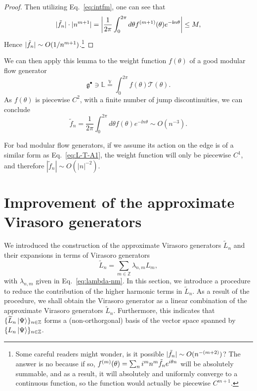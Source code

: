 \documentclass[12pt, nofootinbib]{article}
\theoremstyle{plain}
\theoremstyle{assumption}
\theoremstyle{definition}
\theoremstyle{plain}
\theoremstyle{plain}
\theoremstyle{plain}
\theoremstyle{plain}
\theoremstyle{plain}
\def\veq{\stackrel{\mathbb{V}}{=}}
\def\Lb{\mathbb{L}}
\def\Leff{\widetilde{L}}
\def\Tcft{\mathscr{T}}
\def\gc{\mathfrak{g}^{\bullet}}
\begin{document}
\begin{proof}
    Then utilizing Eq.~\eqref{eq:intfm}, one can see that 
    \begin{equation}
        |\Tilde{f}_n| \cdot|n^{m+1}| =   \left| {1 \over 2\pi} \int_0^{2\pi}d\theta f^{(m+1)}(\theta) e^{-{\bf i} n\theta}  \right| \leq M,
    \end{equation}
    Hence $|\Tilde{f}_n|\sim O(1/n^{m+1})$.\footnote{Some careful readers might wonder, is it possible $|\Tilde{f}_n|\sim O(n^{-(m+2)})$? The answer is no because if so, $f^{(m)}(\theta) = \sum_{n} i^m n^{m} \Tilde{f}_n e^{i\theta n}$ will be absolutely summable, and as a result, it will absolutely and uniformly converge to a continuous function, so the function would actually be piecewise $C^{m+1}$.}
\end{proof}

We can then apply this lemma to the weight function $f(\theta)$ of a good modular flow generator 
\begin{equation}\label{eq:L-T-A1}
    \gc \ni \Lb \veq \int_{0}^{2\pi} f(\theta) \Tcft(\theta). 
\end{equation}
As $f(\theta)$ is piecewise $C^2$, with a finite number of jump discontinuities, we can conclude 
\begin{equation}
    \tilde{f}_n = \frac{1}{2\pi}\int_{0}^{2\pi}d\theta f(\theta) e^{-\ii n\theta} \sim O(n^{-3}). 
\end{equation}

For bad modular flow generators, if we assume its action on the edge is of a similar form as Eq.~\eqref{eq:L-T-A1}, the weight function will only be piecewise $C^1$, and therefore $|\tilde{f}_n|\sim O(|n|^{-2})$. 


\section{Improvement of the approximate Virasoro generators}
\label{app:improvement}
We introduced the construction of the approximate Virasoro generators $\Leff_n$ and their expansions in terms of Virasoro generators 
\begin{equation}
     \Leff_n = \sum_{m\in\mathbb{Z}}\lambda_{n,m}L_m,
\end{equation}
with $\lambda_{n,m}$ given in Eq.~\eqref{eq:lambda-nm}. In this section, we introduce a procedure to reduce the contribution of the higher harmonic terms in $\Leff_n$. As a result of the procedure, we shall obtain the Virasoro generator as a linear combination of the approximate Virasoro generators $\Leff_n$. Furthermore, this indicates that $\{\Leff_n\ket{\Psi}\}_{n\in\mathbb{Z}}$ forms a (non-orthorgonal) basis of the vector space spanned by $\{L_n\left|\Psi\right\rangle\}_{n\in\mathbb{Z}}$. 
\end{document}
